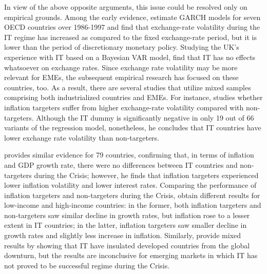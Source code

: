 \documentclass{article}
\begin{document}
In view of the above opposite arguments, this issue could be resolved only on empirical grounds. Among the early evidence, \citet{almeida1998} estimate GARCH models for seven OECD countries over 1986-1997 and find that exchange-rate volatility during the IT regime has increased as compared to the fixed exchange-rate period, but it is lower than the period of discretionary monetary policy. Studying the UK’s experience with IT based on a Bayesian VAR model, \citet{lane1998} find that IT has no effects whatsoever on exchange rates. Since exchange rate volatility may be more relevant for EMEs, the subsequent empirical research has focused on these countries, too. As a result, there are several studies that utilize mixed samples comprising both industrialized countries and EMEs. For instance, \citet{rose2007} studies whether inflation targeters suffer from higher exchange-rate volatility compared with non-targeters. Although the IT dummy is significantly negative in only 19 out of 66 variants of the regression model, nonetheless, he concludes that IT countries have lower exchange rate volatility than non-targeters.

\citet{fouejieu2013} provides similar evidence for 79 countries, confirming that, in terms of inflation and GDP growth rate, there were no differences between IT countries and non-targeters during the Crisis; however, he finds that inflation targeters experienced lower inflation volatility and lower interest rates. Comparing the performance of inflation targeters and non-targeters during the Crisis, \citet{roger2009, roger2010} obtain different results for low-income and high-income countries: in the former, both inflation targeters and non-targeters saw similar decline in growth rates, but inflation rose to a lesser extent in IT countries; in the latter, inflation targeters saw smaller decline in growth rates and slightly less increase in inflation. Similarly, \citet{fry-mckibbin2014} provide mixed results by showing that IT have insulated developed countries from the global downturn, but the results are inconclusive for emerging markets in which IT has not proved to be successful regime during the Crisis.
\end{document}
